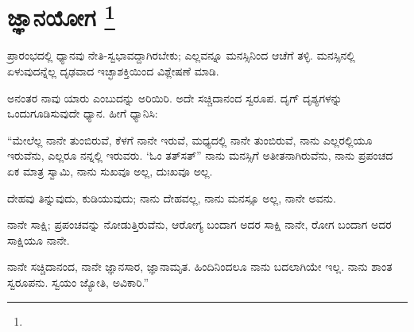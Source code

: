 
\chapter[ಜ್ಞಾನಯೋಗ ]{ಜ್ಞಾನಯೋಗ \protect\footnote{}}

ಪ್ರಾರಂಭದಲ್ಲಿ ಧ್ಯಾನವು ನೇತಿ-ಸ್ವಭಾವದ್ದಾಗಿರಬೇಕು; ಎಲ್ಲವನ್ನೂ ಮನಸ್ಸಿನಿಂದ ಆಚೆಗೆ ತಳ್ಳಿ. ಮನಸ್ಸಿನಲ್ಲಿ ಏಳುವುದನ್ನೆಲ್ಲ ದೃಢವಾದ ಇಚ್ಛಾಶಕ್ತಿಯಿಂದ ವಿಶ್ಲೇಷಣೆ ಮಾಡಿ.

ಅನಂತರ ನಾವು ಯಾರು ಎಂಬುದನ್ನು ಅರಿಯಿರಿ. ಅದೇ ಸಚ್ಚಿದಾನಂದ ಸ್ವರೂಪ. ದೃಗ್​ ದೃಶ್ಯಗಳನ್ನು ಒಂದುಗೂಡಿಸುವುದೇ ಧ್ಯಾನ. ಹೀಗೆ ಧ್ಯಾನಿಸಿ:

“ಮೇಲೆಲ್ಲ ನಾನೇ ತುಂಬಿರುವೆ, ಕೆಳಗೆ ನಾನೇ ಇರುವೆ, ಮಧ್ಯದಲ್ಲಿ ನಾನೇ ತುಂಬಿರುವೆ, ನಾನು ಎಲ್ಲರಲ್ಲಿಯೂ ಇರುವೆನು, ಎಲ್ಲರೂ ನನ್ನಲ್ಲಿ ಇರುವರು. ‘ಓಂ ತತ್​ಸತ್​” ನಾನು ಮನಸ್ಸಿಗೆ ಅತೀತನಾಗಿರುವೆನು, ನಾನು ಪ್ರಪಂಚದ ಏಕ ಮಾತ್ರ ಸ್ವಾಮಿ, ನಾನು ಸುಖವೂ ಅಲ್ಲ, ದುಃಖವೂ ಅಲ್ಲ.

ದೇಹವು ತಿನ್ನುವುದು, ಕುಡಿಯುವುದು; ನಾನು ದೇಹವಲ್ಲ, ನಾನು ಮನಸ್ಸೂ ಅಲ್ಲ, ನಾನೇ ಅವನು.

ನಾನೇ ಸಾಕ್ಷಿ; ಪ್ರಪಂಚವನ್ನು ನೋಡುತ್ತಿರುವೆನು, ಆರೋಗ್ಯ ಬಂದಾಗ ಅದರ ಸಾಕ್ಷಿ ನಾನೇ, ರೋಗ ಬಂದಾಗ ಅದರ ಸಾಕ್ಷಿಯೂ ನಾನೇ.

ನಾನೇ ಸಚ್ಚಿದಾನಂದ, ನಾನೇ ಜ್ಞಾನಸಾರ, ಜ್ಞಾನಾಮೃತ. ಹಿಂದಿನಿಂದಲೂ ನಾನು ಬದಲಾಗಿಯೇ ಇಲ್ಲ. ನಾನು ಶಾಂತ ಸ್ವರೂಪನು. ಸ್ವಯಂ ಜ್ಯೋತಿ, ಅವಿಕಾರಿ.”

